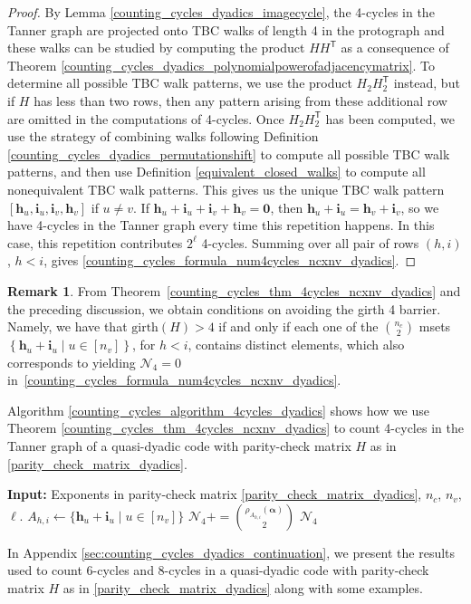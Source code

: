 \documentclass[11pt]{article}
\newcommand{\Input}{\State \textbf{Input: }}
\theoremstyle{plain}
\theoremstyle{plain}
\theoremstyle{definition}
\newtheorem{rem}[theo]{Remark}
\numberwithin{theo}{section}
\newcommand{\cN}{{\mathcal N}}
\newcommand{\bzero}{\mathbf{0}}
\newcommand{\bh}{{\mathbf h}}
\newcommand{\bi}{{\mathbf i}}
\newcommand{\balpha}{{\boldsymbol \alpha}}
\newcounter{alp}
\newcounter{rom}
\begin{document}
\begin{proof}
By Lemma \ref{counting_cycles_dyadics_imagecycle}, the 4-cycles in the Tanner graph are projected onto TBC walks of length 4 in the protograph and these walks can be studied by computing the product $HH^\mathsf{T}$ as a consequence of Theorem \ref{counting_cycles_dyadics_polynomialpowerofadjacencymatrix}. To determine all possible TBC walk patterns, we use the product $H_2H_2^\mathsf{T}$ instead, but if $H$ has less than two rows, then any pattern arising from these additional row are omitted in the computations of 4-cycles. Once $H_2H_2^\mathsf{T}$ has been computed, we use the strategy of combining walks following Definition \ref{counting_cycles_dyadics_permutationshift} to compute all possible TBC walk patterns, and then use Definition \ref{equivalent_closed_walks} to compute all nonequivalent TBC walk patterns. This gives us the unique TBC walk pattern $[\bh_u,\bi_u,\bi_v,\bh_v]$ if $u\neq v$. If $\bh_u+\bi_u+\bi_v+\bh_v=\bzero$, then $\bh_u+\bi_u=\bh_v+\bi_v$, so we have 4-cycles in the Tanner graph every time this repetition happens. In this case, this repetition contributes $2^\ell$ 4-cycles. Summing over all pair of rows $(h,i)$, $h<i$, gives \eqref{counting_cycles_formula_num4cycles_ncxnv_dyadics}. 
\end{proof}
\begin{rem}
From Theorem~\ref{counting_cycles_thm_4cycles_ncxnv_dyadics} and the preceding discussion, we obtain conditions on avoiding the girth 4 barrier. 
Namely,  we have that $\text{girth}(H)>4$ if and only if each one of the $\binom{n_c}{2}$ 
msets 
$\left\{\bh_u+\bi_u\mid u\in[n_v]\right\}$, for $h<i$, contains distinct elements, which also corresponds to yielding $\cN_4 = 0$ in~\eqref{counting_cycles_formula_num4cycles_ncxnv_dyadics}.
\end{rem}

Algorithm \ref{counting_cycles_algorithm_4cycles_dyadics} shows how we use Theorem \ref{counting_cycles_thm_4cycles_ncxnv_dyadics} to count 4-cycles in the Tanner graph of a quasi-dyadic code with parity-check matrix $H$ as in \eqref{parity_check_matrix_dyadics}. 
\begin{algorithm}[t]
\caption{Counting 4-cycles}
\label{counting_cycles_algorithm_4cycles_dyadics}
\begin{algorithmic}[0]
\Input{Exponents in parity-check matrix \eqref{parity_check_matrix_dyadics}, $n_c$, $n_v$, $\ell$.}
	\State $A_{h,i}\gets\{\bh_u+\bi_u\mid u\in[n_v]\}$
		\For{$\balpha\in\mathbb{F}_2^\ell\cap A_{h,i}$}
			\State $\mathcal{N}_4+=\displaystyle\binom{\rho_{A_{h,i}}(\balpha)}{2}$
		\EndFor
	\EndFor
\EndFor
\State \Return $\mathcal{N}_4$
\end{algorithmic}
\end{algorithm}
In Appendix \ref{sec:counting_cycles_dyadics_continuation}, we present the results used to count 6-cycles and 8-cycles in a quasi-dyadic code with parity-check matrix $H$ as in \eqref{parity_check_matrix_dyadics} along with some examples.
\end{document}
